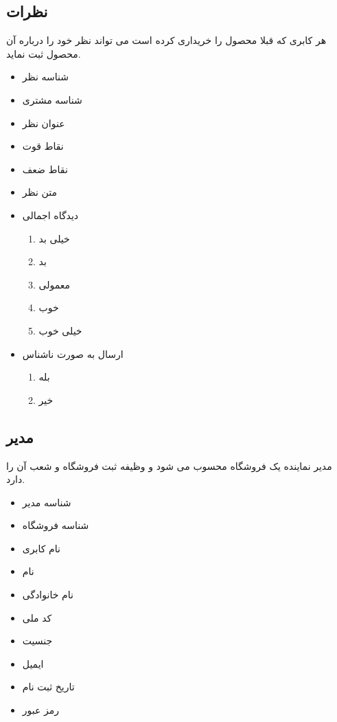 \documentclass[]{article}
\begin{document}
\subsection{نظرات}
هر کابری که قبلا محصول را خریداری کرده است می تواند نظر خود را درباره آن محصول ثبت نماید.
\begin{itemize}
\item شناسه نظر
\item شناسه مشتری
\item عنوان نظر
\item نقاط قوت  
\item نقاط ضعف
\item متن نظر
\item دیدگاه اجمالی
\begin{enumerate}
\item خیلی بد
\item بد
\item معمولی
\item  خوب
\item  خیلی خوب
\end{enumerate}
\item ارسال به صورت ناشناس
\begin{enumerate}
\item بله
\item خیر
\end{enumerate}
\end{itemize}





\subsection{مدیر}
مدیر نماینده یک فروشگاه محسوب می شود و وظیفه ثبت فروشگاه و شعب آن را دارد.
\begin{itemize}
\item شناسه مدیر
\item شناسه فروشگاه
\item نام کابری
\item نام
\item نام خانوادگی
\item کد ملی
\item جنسیت
\item ایمیل
\item تاریخ ثبت نام
\item رمز عبور
\end{itemize}
\end{document}
